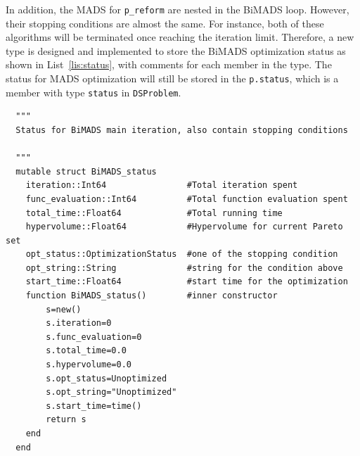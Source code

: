 \documentclass[11pt,oneside,onecolumn,openright]{article}
\begin{document}
    In addition, the MADS for \verb|p_reform| are nested in the BiMADS loop. However, their stopping conditions are almost the same. For instance, both of these algorithms will be terminated once reaching the iteration limit. Therefore, a new type is designed and implemented to store the BiMADS optimization status as shown in List~\ref{lis:status}, with comments for each member in the type. The status for MADS optimization will still be stored in the \verb|p.status|, which is a member with type \verb|status| in \verb|DSProblem|.
        \begin{listing}[ht]
      \begin{verbatim}
  """
  Status for BiMADS main iteration, also contain stopping conditions

  """
  mutable struct BiMADS_status
    iteration::Int64                #Total iteration spent
    func_evaluation::Int64          #Total function evaluation spent
    total_time::Float64             #Total running time
    hypervolume::Float64            #Hypervolume for current Pareto set
    opt_status::OptimizationStatus  #one of the stopping condition
    opt_string::String              #string for the condition above
    start_time::Float64             #start time for the optimization
    function BiMADS_status()        #inner constructor
        s=new()
        s.iteration=0
        s.func_evaluation=0
        s.total_time=0.0
        s.hypervolume=0.0
        s.opt_status=Unoptimized
        s.opt_string="Unoptimized"
        s.start_time=time()
        return s
    end
  end
    \end{verbatim}
  \cprotect\caption{A new type named \verb|BiMADS_status|}
  \label{lis:status}
  \end{listing}
\end{document}
